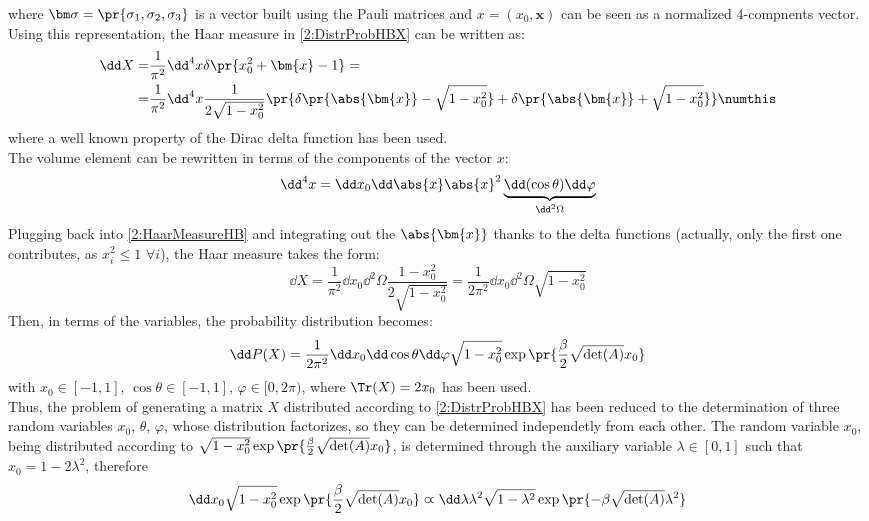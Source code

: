 where $\bm\sigma=\pr{\sigma_1,\sigma_2,\sigma_3}$ is a vector built using the Pauli matrices and $x=(x_0,\bm{x})$ can be seen as a normalized $4$-compnents vector.
Using this representation, the Haar measure in \eqref{2:DistrProbHBX} can be written as:
\begin{align*}
    \dd X =& \frac1{\pi^2} \dd^4x \delta\pr{x_0^2+\bm{x}-1} =\\
    =& \frac1{\pi^2} \dd^4x \frac{1}{2\sqrt{1-x_0^2}} \pr{\delta\pr{\abs{\bm{x}}-\sqrt{1-x_0^2}}+\delta\pr{\abs{\bm{x}}+\sqrt{1-x_0^2}}} \numthis\label{2:HaarMeasureHB}
\end{align*}
where a well known property of the Dirac delta function has been used.\\
The volume element can be rewritten in terms of the components of the vector $x$:
\begin{equation}
    \dd^4x = \dd x_0\dd\abs{x}\abs{x}^2\underbrace{\dd(\cos\theta)\dd\varphi}_{\dd^2\Omega} \label{2:VolumeElemParam}
\end{equation}
Plugging back into \eqref{2:HaarMeasureHB} and integrating out the $\abs{\bm{x}}$ thanks to the delta functions (actually, only the first one contributes, as $x_i^2\leq1$ $\forall i$), the Haar measure takes the form:
\begin{equation}
    \dd X = \frac1{\pi^2}\dd x_0\dd^2\Omega\frac{1-x_0^2}{2\sqrt{1-x_0^2}} = \frac1{2\pi^2} \dd x_0 \dd^2\Omega \sqrt{1-x_0^2} \label{2:HaarMeasureHBSimplified}
\end{equation}
Then, in terms of the variables, the probability distribution becomes:
\begin{equation}
    \dd P(X) = \frac1{2\pi^2} \dd x_0 \dd\cos\theta \dd\varphi \sqrt{1-x_0^2} \exp\pr{\frac\beta2 \sqrt{\det(A)}x_0} \label{2:DistrProbHBXSimplified}
\end{equation}
with $x_0\in[-1,1]$, $\cos\theta\in[-1,1]$, $\varphi\in[0,2\pi)$, where $\Tr(X)=2x_0$ has been used.\\
Thus, the problem of generating a matrix $X$ distributed according to \eqref{2:DistrProbHBX} has been reduced to the determination of three random variables $x_0$, $\theta$, $\varphi$, whose distribution factorizes, so they can be determined independetly from each other.
The random variable $x_0$, being distributed according to $\sqrt{1-x_0^2} \exp\pr{\frac\beta2 \sqrt{\det(A)}x_0}$, is determined through the auxiliary variable $\lambda\in[0,1]$ such that $x_0 = 1-2\lambda^2$, therefore
\begin{equation}
    \dd x_0\sqrt{1-x_0^2} \exp\pr{\frac\beta2 \sqrt{\det(A)}x_0} \varpropto \dd\lambda\lambda^2\sqrt{1-\lambda^2} \exp\pr{-\beta \sqrt{\det(A)}\lambda^2} \label{2:LambdaDistrHB}
\end{equation}
